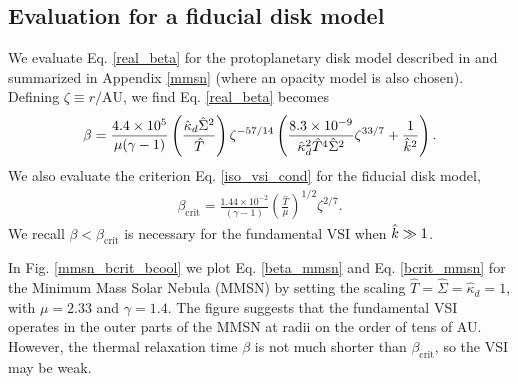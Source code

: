 \subsection{Evaluation for a fiducial disk model}
We evaluate Eq. \ref{real_beta} for the protoplanetary disk model
described in \cite{chiang10} and summarized in Appendix \ref{mmsn}
(where an opacity model is also chosen). Defining $\zeta\equiv
r/\mathrm{AU}$, we find Eq. \ref{real_beta} becomes
\begin{align}\label{beta_mmsn}
\beta =
\frac{4.4\times10^5}{\mu(\gamma-1)}\left(\frac{\hat{\kappa}_d\hat{\Sigma}^2}{\hat{T}}\right)\zeta^{-57/14}\left(\frac{8.3\times10^{-9}}{\hat{\kappa}_d^2\hat{T}^4\hat{\Sigma}^2}\zeta^{33/7}+\frac{1}{\hat{k}^2}\right).    
\end{align}
We also evaluate the criterion Eq. \ref{iso_vsi_cond} for the fiducial
disk model,  
\begin{align}\label{bcrit_mmsn}
  \beta_\mathrm{crit} = \frac{1.44\times10^{-2}}{(\gamma
    -1)}\left(\frac{\hat{T}}{\mu}\right)^{1/2}\zeta^{2/7}. 
\end{align}
We recall $\beta < \beta_\mathrm{crit}$ is necessary for the
fundamental VSI when $\hat{k}\gg 1$. %

In Fig. \ref{mmsn_bcrit_bcool} we plot Eq. \ref{beta_mmsn} and
Eq. \ref{bcrit_mmsn} for the Minimum Mass Solar Nebula (MMSN) by setting
the scaling $\hat{T}=\hat{\Sigma}=\hat{\kappa}_d=1$, with $\mu =
2.33$ and $\gamma=1.4$. The figure suggests that the fundamental VSI
operates in the outer parts of the MMSN at radii on 
the order of tens of AU. However, the thermal relaxation time $\beta$
is not much shorter than $\beta_\mathrm{crit}$, so the VSI may be 
weak.   


